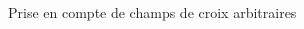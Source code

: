 \documentclass[compress,10pt,aspectratio=169]{beamer}
\begin{document}
\begin{frame}{Prise en compte de champs de croix arbitraires}
\begin{columns}
\begin{column}{0.33\textwidth}
{        %
        }
        \end{column}
    \end{columns}

\end{frame}




\end{document}

